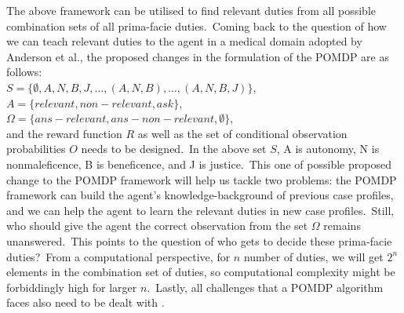 The above framework can be utilised to find relevant duties from all possible combination sets of all prima-facie duties.\ Coming back to the question of how we can teach relevant duties to the agent in a medical domain adopted by Anderson et al., the proposed changes in the formulation of the POMDP are as follows:\\ 
$S = \{\emptyset, A, N, B, J, … , (A,N,B), … , (A,N,B,J)\}$,\\
$A = \{relevant, non-relevant, ask\}$,\\
$\Omega = \{ans-relevant,ans-non-relevant,\emptyset \}$,\\
and the reward function $R$ as well as the set of conditional observation probabilities $O$ needs to be designed.\ In the above set $S$, A is autonomy, N is nonmaleficence, B is beneficence, and J is justice.\ This one of possible proposed change to the POMDP framework will help us tackle two problems: the POMDP framework can build the agent's knowledge-background of previous case profiles, and we can help the agent to learn the relevant duties in new case profiles.\ Still, who should give the agent the correct observation from the set $\Omega$ remains unanswered.\ This points to the question of who gets to decide these prima-facie duties?\ From a computational perspective, for $n$ number of duties, we will get $2^n$ elements in the combination set of duties, so computational complexity might be forbiddingly high for larger $n$.\ Lastly, all challenges that a POMDP algorithm faces also need to be dealt with \cite[p.~7]{Abel2016ReinforcementLA}.